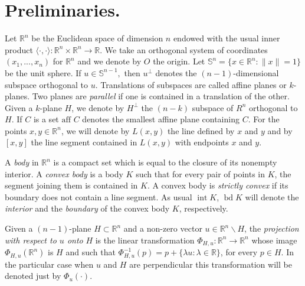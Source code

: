 \documentclass[12pt]{amsart}
\newcommand{\inte}{\operatorname*{int}}
\newcommand{\bd}{\operatorname*{bd}}
\newcommand{\Rn}{\mathbb{R}^{n}}
\begin{document}
\section{Preliminaries.}\label{preliminaries} 
                   Let $\mathbb{R}^{n}$ be the Euclidean space of dimension $n$ endowed with the 
                   usual inner pro\-duct 
                   $\langle \cdot, \cdot\rangle : \mathbb{R}^{n} \times \mathbb{R}^{n} \rightarrow 
                   \mathbb{R}$. We take an orthogonal system of coordinates $(x_1,...,x_{n} )$ for  
                   $\mathbb{R}^{n}$ and we denote by $O$ the origin. Let $\mathbb{S}^{n}=\{x\in 
                   \mathbb{R}^{n}: \|x\| = 1\}$ be the unit sphere. If $u\in \mathbb S^{n-1},$ then 
                   $u^\perp$ denotes the $(n-1)$-dimensional subspace orthogonal to $u$. Translations
                   of subspaces are called affine planes or $k$-planes.  Two planes are \emph{parallel} 
                   if one is contained in a translation of the other. Given a $k$-plane $H$, we denote 
                   by $H^\perp$ the $(n-k)$ subspace of $R^n$ orthogonal to $H$. If $C$ is a set 
                   $\text{aff }{C}$ denotes the smallest affine plane containing $C$. For the points 
                   $x,y \in \Rn$, we will denote by $L(x,y)$ the line defined by $x$ and $y$ and by 
                   $[x,y]$ the line segment contained in $L(x,y)$ with endpoints $x$ and $y$.   

                    A \textit{body} in $\Rn$ is a compact set which is equal to the closure of its 
                    nonempty interior. A \textit{convex body} is a body $K$ such that for every pair of 
                    points in $K$, the segment joining them is contained in $K$. A convex body is 
                    \textit{strictly convex} if its boundary does not contain a line segment. As usual 
                    $\inte K$, $\bd K$ will denote the \textit{interior} and the \textit{boundary} of the 
                    convex body $K$, respectively.

                    Given a $(n-1)$-plane $H\subset \Rn$ and a non-zero vector 
                    $u\in \Rn\backslash H$, the \textit{projection with respect to $u$ onto} $H$ is the 
                    linear transformation $\Phi_{H,u}:\Rn \to \Rn$ whose image $\Phi_{H,u}(\Rn)$ is 
                    $H$ and such that $\Phi_{H,u}^{-1}(p) =p+ \{\lambda u: \lambda \in \mathbb{R}\}$, 
                    for every $p\in H$. In the particular case when $u$ and $H$ are perpendicular this 
                    transformation will be denoted just by $\Phi_ u(\cdot)$. 
\end{document}
